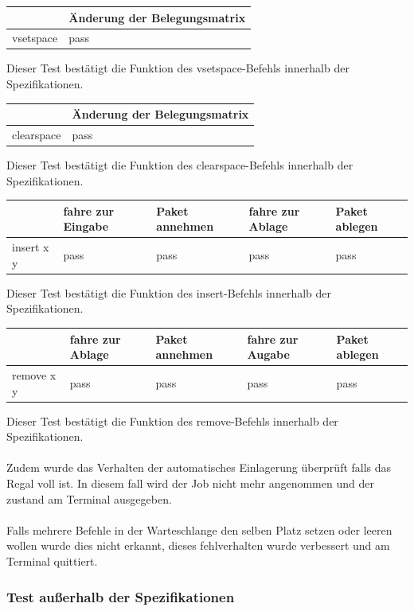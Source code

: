 \begin{tabular}{|l|l|}
\hline
         	& Änderung der Belegungsmatrix\\
\hline
vsetspace & pass\\
\hline
\end{tabular}

Dieser Test bestätigt die Funktion des vsetspace-Befehls innerhalb der Spezifikationen.

\begin{tabular}{|l|l|}
\hline
         	& Änderung der Belegungsmatrix\\
\hline
clearspace & pass\\
\hline
\end{tabular}

Dieser Test bestätigt die Funktion des clearspace-Befehls innerhalb der Spezifikationen.


\begin{tabular}{|l|l|l|l|l|}
\hline
         	&  fahre zur Eingabe & Paket annehmen   & fahre zur Ablage & Paket ablegen\\
\hline
insert x y & pass & pass & pass & pass\\
\hline
\end{tabular}

Dieser Test bestätigt die Funktion des insert-Befehls innerhalb der Spezifikationen.

\begin{tabular}{|l|l|l|l|l|}
\hline
         	&  fahre zur Ablage & Paket annehmen   & fahre zur Augabe & Paket ablegen\\
\hline
remove x y & pass & pass & pass & pass\\
\hline
\end{tabular}

Dieser Test bestätigt die Funktion des remove-Befehls innerhalb der Spezifikationen.\\
\\
Zudem wurde das Verhalten der automatisches Einlagerung überprüft falls das Regal voll ist. In diesem fall wird der Job nicht mehr angenommen und der zustand am Terminal ausgegeben.\\
\\
Falls mehrere Befehle in der Warteschlange den selben Platz setzen oder leeren wollen wurde dies nicht erkannt, dieses fehlverhalten wurde verbessert  und am Terminal quittiert.


\subsubsection {Test außerhalb der Spezifikationen}

